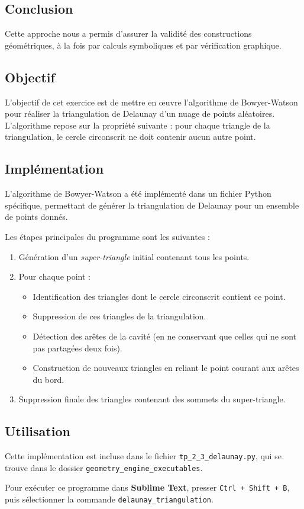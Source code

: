 \documentclass[a4paper,12pt]{article}
\begin{document}
\subsection*{Conclusion}

Cette approche nous a permis d’assurer la validité des constructions géométriques, à la fois par calculs symboliques et par vérification graphique.



\subsection*{Objectif}

L'objectif de cet exercice est de mettre en œuvre l'algorithme de Bowyer-Watson pour réaliser la triangulation de Delaunay d’un nuage de points aléatoires. L'algorithme repose sur la propriété suivante : pour chaque triangle de la triangulation, le cercle circonscrit ne doit contenir aucun autre point.

\newpage

\subsection*{Implémentation}

L'algorithme de Bowyer-Watson a été implémenté dans un fichier Python spécifique, permettant de générer la triangulation de Delaunay pour un ensemble de points donnés. 

Les étapes principales du programme sont les suivantes :

\begin{enumerate}
    \item Génération d’un \textit{super-triangle} initial contenant tous les points.
    \item Pour chaque point :
    \begin{itemize}
        \item Identification des triangles dont le cercle circonscrit contient ce point.
        \item Suppression de ces triangles de la triangulation.
        \item Détection des arêtes de la cavité (en ne conservant que celles qui ne sont pas partagées deux fois).
        \item Construction de nouveaux triangles en reliant le point courant aux arêtes du bord.
    \end{itemize}
    \item Suppression finale des triangles contenant des sommets du super-triangle.
\end{enumerate}

\subsection*{Utilisation}

Cette implémentation est incluse dans le fichier \texttt{tp\_2\_3\_delaunay.py}, qui se trouve dans le dossier \texttt{geometry\_engine\_executables}.

Pour exécuter ce programme dans \textbf{Sublime Text}, presser \texttt{Ctrl + Shift + B}, puis sélectionner la commande \texttt{delaunay\_triangulation}.
\end{document}
